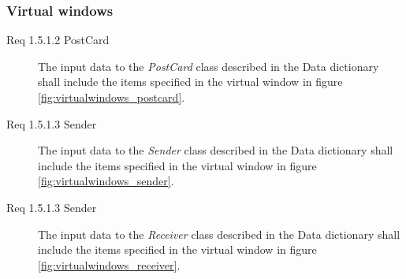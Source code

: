 \documentclass[10pt,a4paper]{article}
\begin{document}
\subsubsection{Virtual windows}
\begin {description}
\item[Req 1.5.1.2 PostCard] The input data to the \textit{PostCard} class described in the Data dictionary shall include the items specified in the virtual window in figure \ref{fig:virtualwindows_postcard}.

\item[Req 1.5.1.3 Sender] The input data to the \textit{Sender} class described in the Data dictionary shall include the items specified in the virtual window in figure \ref{fig:virtualwindows_sender}.

\item[Req 1.5.1.3 Sender] The input data to the \textit{Receiver} class described in the Data dictionary shall include the items specified in the virtual window in figure \ref{fig:virtualwindows_receiver}.

\end{description}
\hfill
\end{document}
